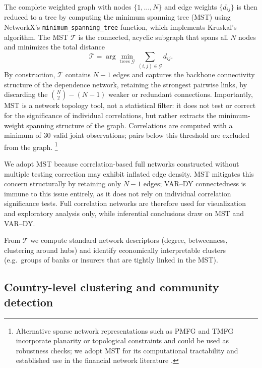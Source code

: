 The complete weighted graph with nodes $\{1,\dots,N\}$ and edge weights $\{d_{ij}\}$ is
then reduced to a tree by computing the minimum spanning tree (MST) \citep{Mantegna1999}
using NetworkX's \texttt{minimum\_spanning\_tree} function, which implements Kruskal's
algorithm. The MST $\mathcal{T}$ is the connected, acyclic
subgraph that spans all $N$ nodes and minimizes the total distance
\begin{equation}
  \mathcal{T}
  = \arg\min_{\text{trees } \mathcal{G}}
    \sum_{(i,j) \in \mathcal{G}} d_{ij}.
\end{equation}
By construction, $\mathcal{T}$ contains $N-1$ edges and captures the backbone
connectivity structure of the dependence network, retaining the strongest pairwise links, by
discarding the $\binom{N}{2}-(N-1)$ weaker or redundant connections. Importantly, MST
is a network topology tool, not a statistical filter: it does not test or correct for
the significance of individual correlations, but rather extracts the minimum-weight
spanning structure of the graph. Correlations are computed with a minimum of 30 valid
joint observations; pairs below this threshold are excluded from the graph.%
\footnote{Alternative sparse network representations such as PMFG and TMFG incorporate
planarity or topological constraints and could be used as robustness checks; we adopt
MST for its computational tractability and established use in the financial network
literature \citep{Mantegna1999,MartiEtAl2020}.}

We adopt MST because correlation-based full networks constructed without multiple testing
correction may exhibit inflated edge density. MST mitigates this concern structurally by
retaining only $N-1$ edges; VAR--DY connectedness is immune to this issue entirely, as
it does not rely on individual correlation significance tests. Full correlation networks
are therefore used for visualization and exploratory analysis only, while inferential
conclusions draw on MST and VAR--DY.

From $\mathcal{T}$ we compute standard network descriptors (degree, betweenness, clustering
around hubs) and identify economically interpretable clusters (e.g.\ groups of banks or
insurers that are tightly linked in the MST).

\subsection{Country-level clustering and community detection}\label{subsec:clustering}

